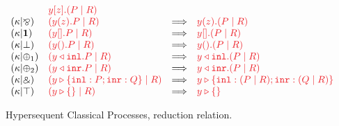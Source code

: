\documentclass[submission,copyright,creativecommons]{eptcs}
\begin{document}
\begin{figure}[htb]
\[\begin{array}{llcll}
      & \tm{\piBoundSend{y}{z}{(\piPar{P}{R})}}
      \\
      \hccpRedKappaMixParr
      & \tm{(\piPar{\piRecv{y}{z}{P}}{R})}
      & \Longrightarrow
      & \tm{\piRecv{y}{z}{(\piPar{P}{R})}}
      \\
      \hccpRedKappaMixOne
      & \tm{(\piPar{\piBoundSend{y}{}{P}}{R})}
      & \Longrightarrow
      & \tm{\piBoundSend{y}{}{(\piPar{P}{R})}}
      \\
      \hccpRedKappaMixBot
      & \tm{(\piPar{\piRecv{y}{}{P}}{R})}
      & \Longrightarrow
      & \tm{\piRecv{y}{}{(\piPar{P}{R})}}
      \\
      \hccpRedKappaMixPlus1
      & \tm{(\piPar{\cpInl{y}{P}}{R})}
      & \Longrightarrow
      & \tm{\cpInl{y}{(\piPar{P}{R})}}
      \\
      \hccpRedKappaMixPlus2
      & \tm{(\piPar{\cpInr{y}{P}}{R})}
      & \Longrightarrow
      & \tm{\cpInr{y}{(\piPar{P}{R})}}
      \\
      \hccpRedKappaMixWith
      & \tm{(\piPar{\cpCase{y}{P}{Q}}{R})}
      & \Longrightarrow
      & \tm{\cpCase{y}{(\piPar{P}{R})}{(\piPar{Q}{R})}}
      \\
      \hccpRedKappaMixTop
      & \tm{(\piPar{\cpAbsurd{y}}{R})}
      & \Longrightarrow
      & \tm{\cpAbsurd{y}}
    \end{array}
  \]
  \begin{center}
    \begin{prooftree*}
      \SYM{\hccpRedGammaNew}
    \end{prooftree*}
    \begin{prooftree*}
      \SYM{\hccpRedGammaMix}
    \end{prooftree*}
    \begin{prooftree*}
      \SYM{\hccpRedGammaEquiv}
    \end{prooftree*}
  \end{center}
  \label{fig:hcp-reduction}
  \caption{Hypersequent Classical Processes, reduction relation.}
\end{figure}
\end{document}
